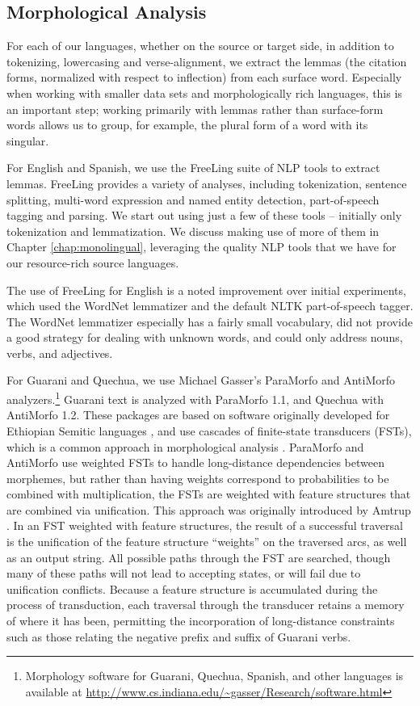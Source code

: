 \subsection{Morphological Analysis}
\label{sec:guaranima}

For each of our languages, whether on the source or target side, in addition to
tokenizing, lowercasing and verse-alignment, we extract the lemmas (the
citation forms, normalized with respect to inflection) from each surface word.
Especially when working with smaller data sets and morphologically rich
languages, this is an important step; working primarily with lemmas rather than
surface-form words allows us to group, for example, the plural form of a word
with its singular.

For English and Spanish, we use the FreeLing suite of NLP tools
\cite{padro12} to extract lemmas. FreeLing provides a variety of analyses,
including tokenization, sentence splitting, multi-word expression and named
entity detection, part-of-speech tagging and parsing.  We start out using just
a few of these tools -- initially only tokenization and lemmatization. We
discuss making use of more of them in Chapter \ref{chap:monolingual},
leveraging the quality NLP tools that we have for our resource-rich source
languages.

The use of FreeLing for English is a noted improvement over initial
experiments, which used the WordNet lemmatizer and the default NLTK
part-of-speech tagger. The WordNet lemmatizer especially has a fairly small
vocabulary, did not provide a good strategy for dealing with unknown words, and
could only address nouns, verbs, and adjectives.

For Guarani and Quechua, we use Michael Gasser's ParaMorfo and AntiMorfo
analyzers.\footnote{Morphology software for Guarani, Quechua, Spanish, and
other languages is available at
\url{http://www.cs.indiana.edu/~gasser/Research/software.html}} Guarani text is
analyzed with ParaMorfo 1.1, and Quechua with AntiMorfo 1.2.  These packages
are based on software originally developed for Ethiopian Semitic languages
\cite{gasser:eacl09}, and use cascades of finite-state transducers (FSTs),
which is a common approach in morphological analysis \cite{beesley+karttunen}.
ParaMorfo and AntiMorfo use weighted FSTs to handle long-distance dependencies
between morphemes, but rather than having weights correspond to probabilities
to be combined with multiplication, the FSTs are weighted with feature
structures that are combined via unification. This approach was originally
introduced by Amtrup \cite{amtrup:03}. In an FST weighted with feature
structures, the result of a successful traversal is the unification of the
feature structure ``weights'' on the traversed arcs, as well as an output
string. All possible paths through the FST are searched, though many of these
paths will not lead to accepting states, or will fail due to unification
conflicts.  Because a feature structure is accumulated during the process of
transduction, each traversal through the transducer retains a memory of where
it has been, permitting the incorporation of long-distance constraints such as
those relating the negative prefix and suffix of Guarani verbs.

